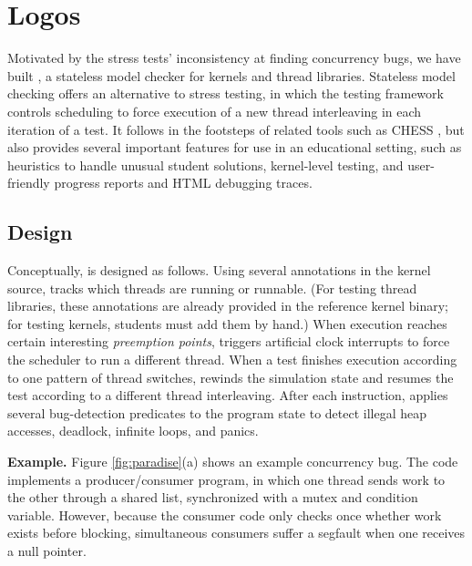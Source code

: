 \section{Logos}
\label{sec:landslide}

Motivated by the stress tests' inconsistency at finding concurrency bugs,
we have built \landslide%
, a stateless model checker for \pebbles kernels and thread libraries.
Stateless model checking \cite{verisoft} offers an alternative
to stress testing,
in which the testing framework controls scheduling to force execution of a new thread interleaving in each iteration of a test.
It follows in the footsteps of related tools such as CHESS \cite{chess},
but also provides several important features for use in an educational setting,
such as heuristics to handle unusual student solutions, kernel-level testing, and user-friendly progress reports and HTML debugging traces.

\subsection{Design}

Conceptually,
\landslide is designed as follows.
Using several annotations in the kernel source, \landslide tracks
which threads are running or runnable.
(For testing thread libraries, these annotations are already provided in the reference kernel binary;
for testing kernels, students must add them by hand.)
When execution reaches certain interesting {\em preemption points},
\landslide triggers artificial clock interrupts
to force the scheduler to run a different thread.
When a test finishes execution according
to one pattern of thread switches,
\landslide rewinds the simulation state
and resumes the test according to a different thread interleaving.
After each instruction,
\landslide applies several bug-detection predicates to
the program state to detect
illegal heap accesses,
deadlock, infinite loops, and panics.

{\bf Example.}
Figure \ref{fig:paradise}(a) shows an example concurrency bug. %
The code implements a producer/consumer program, in which one thread sends work to the other through a shared list,
synchronized with a mutex and condition variable.
However, because the consumer code only checks once whether work exists before blocking,
simultaneous consumers suffer
a segfault when one receives a null  pointer. %

